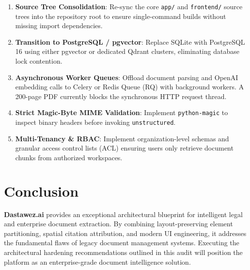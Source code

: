 \documentclass[11pt,a4paper]{article}
\begin{document}
\begin{enumerate}[leftmargin=*]
    \item \textbf{Source Tree Consolidation}: Re-sync the core \texttt{app/} and \texttt{frontend/} source trees into the repository root to ensure single-command builds without missing import dependencies.
    \item \textbf{Transition to PostgreSQL / pgvector}: Replace SQLite with PostgreSQL 16 using either pgvector or dedicated Qdrant clusters, eliminating database lock contention.
    \item \textbf{Asynchronous Worker Queues}: Offload document parsing and OpenAI embedding calls to Celery or Redis Queue (RQ) with background workers. A 200-page PDF currently blocks the synchronous HTTP request thread.
    \item \textbf{Strict Magic-Byte MIME Validation}: Implement \texttt{python-magic} to inspect binary headers before invoking \texttt{unstructured}.
    \item \textbf{Multi-Tenancy \& RBAC}: Implement organization-level schemas and granular access control lists (ACL) ensuring users only retrieve document chunks from authorized workspaces.
\end{enumerate}

\section{Conclusion}
\textbf{Dastawez.ai} provides an exceptional architectural blueprint for intelligent legal and enterprise document extraction. By combining layout-preserving element partitioning, spatial citation attribution, and modern UI engineering, it addresses the fundamental flaws of legacy document management systems. Executing the architectural hardening recommendations outlined in this audit will position the platform as an enterprise-grade document intelligence solution.
\end{document}
